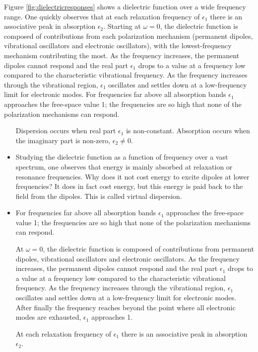 Figure \ref{fig:dielectricresponses} shows a dielectric function over a wide frequency range. One quickly observes that at each relaxation frequency of $\epsilon_1$ there is an associative peak in absorption $\epsilon_2$. Starting at $\omega=0$, the dielectric function is composed of contributions from each polarization mechanism (permanent dipoles, vibrational oscillators and electronic oscillators), with the lowest-frequency mechanism contributing the most. As the frequency increases, the permanent dipoles cannot respond and the real part $\epsilon_1$ drops to a value at a frequency low compared to the characteristic vibrational frequency. As the frequency increases through the vibrational region, $\epsilon_1$ oscillates and settles down at a low-frequency limit for electronic modes. For frequencies far above all absorption bands $\epsilon_1$ approaches the free-space value 1; the frequencies are so high that none of the polarization mechanisms can respond.
\begin{itemize}
    \item [Dispersion occurs when real part $\epsilon_1$ is non-constant. Absorption occurs when the imaginary part is non-zero, $\epsilon_2 \neq 0$.]
    
    \item Studying the dielectric function as a function of frequency over a vast spectrum, one observes that energy is mainly absorbed at relaxation or resonance frequencies. Why does it not cost energy to excite dipoles at lower frequencies? It does in fact cost energy, but this energy is paid back to the field from the dipoles. This is called virtual dispersion.
    
    \item For frequencies far above all absorption bands $\epsilon_1$ approaches the free-space value 1; the frequencies are so high that none of the polarization mechanisms can respond.
    
    At $\omega=0$, the dielectric function is composed of contributions from permanent dipoles, vibrational oscillators and electronic oscillators. As the frequency increases, the permanent dipoles cannot respond and the real part $\epsilon_1$ drops to a value at a frequency low compared to the characteristic vibrational frequency. As the frequency increases through the vibrational region, $\epsilon_1$ oscillates and settles down at a low-frequency limit for electronic modes. After finally the frequency reaches beyond the point where all electronic modes are exhausted, $\epsilon_1$ approaches 1.
    
    At each relaxation frequency of $\epsilon_1$ there is an associative peak in absorption $\epsilon_2$.
\end{itemize}


